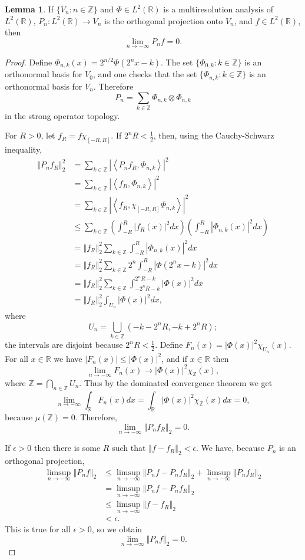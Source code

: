 \documentclass{article}
\newcommand{\inner}[2]{\left\langle #1, #2 \right\rangle}
\newcommand{\norm}[1]{\left\Vert #1 \right\Vert}
\theoremstyle{definition}
\newtheorem{lemma}[theorem]{Lemma}
\theoremstyle{definition}
\begin{document}
\begin{lemma}
If $\{V_n:n \in \mathbb{Z}\}$ and $\Phi \in L^2(\mathbb{R})$ is a multiresolution analysis of $L^2(\mathbb{R})$,
$P_n:L^2(\mathbb{R}) \to V_n$ is the orthogonal projection onto $V_n$, and $f \in L^2(\mathbb{R})$, then
\[
\lim_{n \to -\infty} P_nf=0.
\]
\label{MRAprojections}
\end{lemma}
\begin{proof}
Define $\Phi_{n,k}(x)=2^{n/2} \Phi(2^nx-k)$.
The set $\{\Phi_{0,k}: k \in \mathbb{Z}\}$ is an orthonormal basis for $V_0$, and one checks that the set $\{\Phi_{n,k}: k \in \mathbb{Z}\}$ is an orthonormal
basis for $V_n$. Therefore
\[
P_n = \sum_{k \in \mathbb{Z}} \Phi_{n,k} \otimes \Phi_{n,k}
\]
in the strong operator topology.

For $R>0$, let $f_R= f\chi_{[-R,R]}$. If $2^nR<\frac{1}{2}$, then, using the Cauchy-Schwarz inequality,
\begin{align*}
\norm{P_nf_R}_2^2&=\sum_{k \in \mathbb{Z}} |\inner{P_nf_R}{\Phi_{n,k}}|^2\\
&=\sum_{k \in \mathbb{Z}} |\inner{f_R}{\Phi_{n,k}}|^2\\
&=\sum_{k \in \mathbb{Z}} |\inner{f_R}{\chi_{[-R,R]} \Phi_{n,k}}|^2\\
&\leq \sum_{k \in \mathbb{Z}} \left( \int_{-R}^R |f_R(x)|^2 dx \right) \left( \int_{-R}^R |\Phi_{n,k}(x)|^2 dx \right)\\
&=\norm{f_R}_2^2 \sum_{k \in \mathbb{Z}}  \int_{-R}^R |\Phi_{n,k}(x)|^2 dx\\
&=\norm{f_R}_2^2 \sum_{k \in \mathbb{Z}} 2^n \int_{-R}^R |\Phi(2^nx-k)|^2 dx\\
&=\norm{f_R}_2^2 \sum_{k \in \mathbb{Z}}  \int_{-2^n R-k}^{2^nR-k} |\Phi(x)|^2 dx\\
&=\norm{f_R}_2^2 \int_{U_n} |\Phi(x)|^2 dx,
\end{align*}
where
\[
U_n = \bigcup_{k \in \mathbb{Z}} (-k-2^nR,-k+2^nR);
\]
the intervals are disjoint because $2^nR<\frac{1}{2}$. Define $F_n(x)=|\Phi(x)|^2 \chi_{U_n}(x)$. For all $x \in \mathbb{R}$
we have $|F_n(x)| \leq |\Phi(x)|^2$, and if $x \in \mathbb{R}$ then
\[
\lim_{n \to -\infty} F_n(x) \to |\Phi(x)|^2 \chi_{\mathbb{Z}}(x),
\]
where $\mathbb{Z}=\bigcap_{n \in \mathbb{Z}} U_n$. Thus by the dominated convergence theorem we get
\[
\lim_{n \to -\infty} \int_\mathbb{R} F_n(x) dx = \int_\mathbb{R} |\Phi(x)|^2 \chi_{\mathbb{Z}}(x) dx = 0,
\]
because $\mu(\mathbb{Z})=0$. Therefore,
\[
\lim_{n \to -\infty} \norm{P_n f_R}_2 =0.
\]

If $\epsilon>0$ then there is some $R$ such that $\norm{f-f_R}_2<\epsilon$. We have, because $P_n$ is an orthogonal projection,
\begin{align*}
\limsup_{n \to -\infty} \norm{P_n f}_2 &\leq \limsup_{n \to -\infty} \norm{P_nf -P_nf_R}_2 + \limsup_{n \to -\infty} \norm{P_nf_R}_2\\
&= \limsup_{n \to -\infty} \norm{P_n f- P_nf_R}_2\\
&\leq \limsup_{n \to -\infty} \norm{f-f_R}_2\\
&<\epsilon.
\end{align*}
This is true for all $\epsilon>0$, so we obtain
\[
\lim_{n \to -\infty} \norm{P_nf}_2 =0.
\]


\end{proof}
\end{document}

